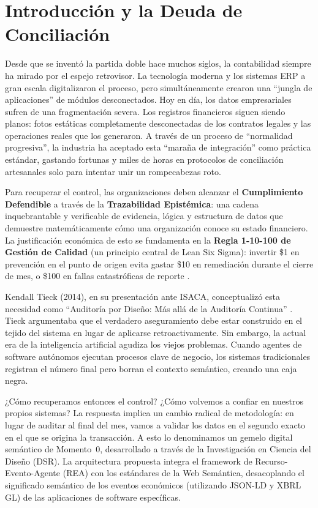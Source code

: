 \documentclass[12pt, a4paper]{article}
\begin{document}
\section{Introducción y la Deuda de Conciliación}

Desde que se inventó la partida doble hace muchos siglos, la contabilidad siempre ha mirado por el espejo retrovisor. La tecnología moderna y los sistemas ERP a gran escala digitalizaron el proceso, pero simultáneamente crearon una ``jungla de aplicaciones'' de módulos desconectados. Hoy en día, los datos empresariales sufren de una fragmentación severa. Los registros financieros siguen siendo planos: fotos estáticas completamente desconectadas de los contratos legales y las operaciones reales que los generaron. A través de un proceso de ``normalidad progresiva'', la industria ha aceptado esta ``maraña de integración'' como práctica estándar, gastando fortunas y miles de horas en protocolos de conciliación artesanales solo para intentar unir un rompecabezas roto.

Para recuperar el control, las organizaciones deben alcanzar el \textbf{Cumplimiento Defendible} a través de la \textbf{Trazabilidad Epistémica}: una cadena inquebrantable y verificable de evidencia, lógica y estructura de datos que demuestre matemáticamente cómo una organización conoce su estado financiero. La justificación económica de esto se fundamenta en la \textbf{Regla 1-10-100 de Gestión de Calidad} (un principio central de Lean Six Sigma): invertir \$1 en prevención en el punto de origen evita gastar \$10 en remediación durante el cierre de mes, o \$100 en fallas catastróficas de reporte \cite{defeo2017}.

Kendall Tieck (2014), en su presentación ante ISACA, conceptualizó esta necesidad como ``Auditoría por Diseño: Más allá de la Auditoría Continua'' \cite{tieck2014}. Tieck argumentaba que el verdadero aseguramiento debe estar construido en el tejido del sistema en lugar de aplicarse retroactivamente. Sin embargo, la actual era de la inteligencia artificial agudiza los viejos problemas. Cuando agentes de software autónomos ejecutan procesos clave de negocio, los sistemas tradicionales registran el número final pero borran el contexto semántico, creando una caja negra.

¿Cómo recuperamos entonces el control? ¿Cómo volvemos a confiar en nuestros propios sistemas? La respuesta implica un cambio radical de metodología: en lugar de auditar al final del mes, vamos a validar los datos en el segundo exacto en el que se origina la transacción. A esto lo denominamos un gemelo digital semántico de Momento~0, desarrollado a través de la Investigación en Ciencia del Diseño (DSR). La arquitectura propuesta integra el framework de Recurso-Evento-Agente (REA) con los estándares de la Web Semántica, desacoplando el significado semántico de los eventos económicos (utilizando JSON-LD y XBRL GL) de las aplicaciones de software específicas.
\end{document}
